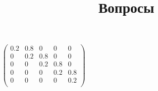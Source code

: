 \documentclass[12pt]{article}
\begin{document}
\title{Вопросы}
\date{}
\maketitle
$
  \begin{pmatrix} 
    0.2 & 0.8 & 0 & 0 & 0 \\
    0 & 0.2 & 0.8 & 0 & 0 \\
    0 & 0 & 0.2 & 0.8 & 0 \\
    0 & 0 & 0 & 0.2 & 0.8 \\
    0 & 0 & 0 & 0 & 0.2 \\
  \end{pmatrix}
$
\end{document}
